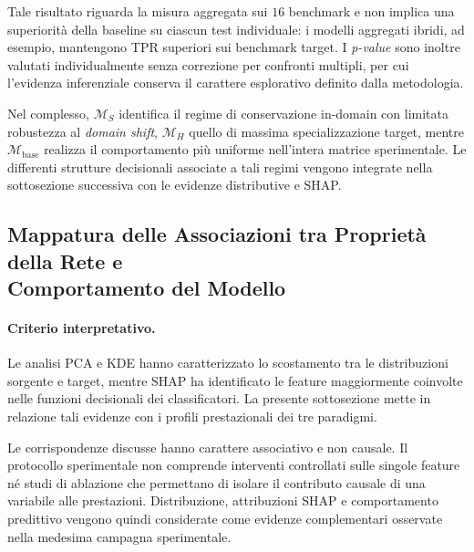 Tale risultato riguarda la misura aggregata sui $16$ benchmark e non implica una superiorità della baseline su ciascun test individuale: i modelli aggregati ibridi, ad esempio, mantengono TPR superiori sui benchmark target.
I \textit{p-value} sono inoltre valutati individualmente senza correzione per confronti multipli, per cui l'evidenza inferenziale conserva il carattere esplorativo definito dalla metodologia.

Nel complesso, $\mathcal{M}_{S}$ identifica il regime di conservazione in-domain con limitata robustezza al \textit{domain shift}, $\mathcal{M}_{H}$ quello di massima specializzazione target, mentre $\mathcal{M}_{\mathrm{base}}$ realizza il comportamento più uniforme nell'intera matrice sperimentale. 
Le differenti strutture decisionali associate a tali regimi vengono integrate nella sottosezione successiva con le evidenze distributive e SHAP.



\subsection[Mappatura delle Associazioni tra Proprietà della Rete e Comportamento del Modello]{Mappatura delle Associazioni tra Proprietà della Rete e\\Comportamento del Modello}
\label{subsec:sintesi_causa_effetto}

\paragraph{Criterio interpretativo.}
Le analisi PCA e KDE hanno caratterizzato lo scostamento tra le distribuzioni sorgente e target, mentre SHAP ha identificato le feature maggiormente coinvolte nelle funzioni decisionali dei classificatori. 
La presente sottosezione mette in relazione tali evidenze con i profili prestazionali dei tre paradigmi.

Le corrispondenze discusse hanno carattere associativo e non causale. 
Il protocollo sperimentale non comprende interventi controllati sulle singole feature né studi di ablazione che permettano di isolare il contributo causale di una variabile alle prestazioni. 
Distribuzione, attribuzioni SHAP e comportamento predittivo vengono quindi considerate come evidenze complementari osservate nella medesima campagna sperimentale.

